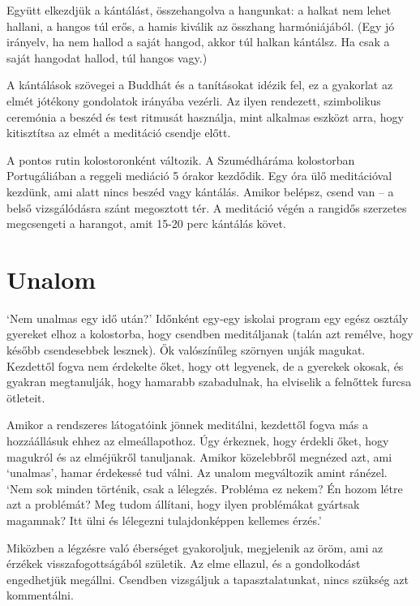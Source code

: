 Együtt elkezdjük a kántálást, összehangolva a hangunkat: a halkat nem
lehet hallani, a hangos túl erős, a hamis kiválik az összhang
harmóniájából. (Egy jó irányelv, ha nem hallod a saját hangod, akkor túl
halkan kántálsz. Ha csak a saját hangodat hallod, túl hangos vagy.)

A kántálások szövegei a Buddhát és a tanításokat idézik fel, ez a
gyakorlat az elmét jótékony gondolatok irányába vezérli. Az ilyen
rendezett, szimbolikus ceremónia a beszéd és test ritmusát használja,
mint alkalmas eszközt arra, hogy kitisztítsa az elmét a meditáció
csendje előtt.

A pontos rutin kolostoronként változik. A Szumédháráma kolostorban
Portugáliában a reggeli mediáció 5 órakor kezdődik. Egy óra ülő
meditációval kezdünk, ami alatt nincs beszéd vagy kántálás. Amikor
belépsz, csend van -- a belső vizsgálódásra szánt megosztott tér. A
meditáció végén a rangidős szerzetes megcsengeti a harangot, amit 15-20
perc kántálás követ.

\section{Unalom}


\noindent `Nem unalmas egy idő után?' Időnként egy-egy iskolai program
egy egész osztály gyereket elhoz a kolostorba, hogy csendben
meditáljanak (talán azt remélve, hogy később csendesebbek lesznek). Ők
valószínűleg szörnyen unják magukat. Kezdettől fogva nem érdekelte őket,
hogy ott legyenek, de a gyerekek okosak, és gyakran megtanulják, hogy
hamarabb szabadulnak, ha elviselik a felnőttek furcsa ötleteit.

Amikor a rendszeres látogatóink jönnek meditálni, kezdettől fogva más a
hozzáállásuk ehhez az elmeállapothoz. Úgy érkeznek, hogy érdekli őket,
hogy magukról és az elméjükről tanuljanak. Amikor közelebbről megnézed
azt, ami `unalmas', hamar érdekessé tud válni. Az unalom megváltozik
amint ránézel. `Nem sok minden történik, csak a lélegzés. Probléma ez
nekem? Én hozom létre azt a problémát? Meg tudom állítani, hogy ilyen
problémákat gyártsak magamnak? Itt ülni és lélegezni tulajdonképpen
kellemes érzés.'

Miközben a légzésre való éberséget gyakoroljuk, megjelenik az öröm, ami
az érzékek visszafogottságából születik. Az elme ellazul, és a
gondolkodást engedhetjük megállni. Csendben vizsgáljuk a
tapasztalatunkat, nincs szükség azt kommentálni.

